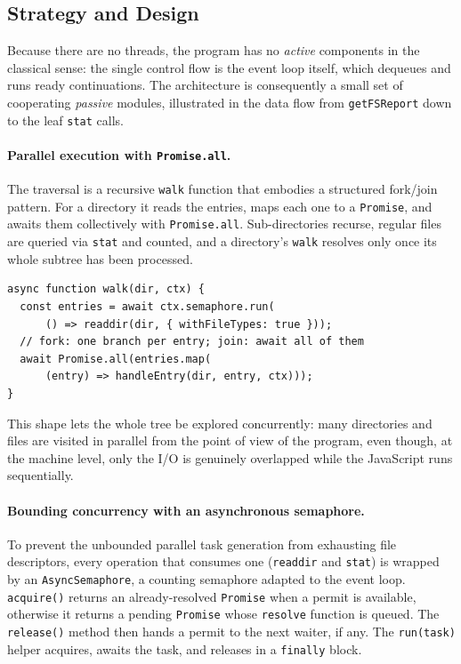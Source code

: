 \documentclass{scrartcl}
\begin{document}
\subsection{Strategy and Design}

Because there are no threads, the program has no \emph{active} components in the classical sense: the single control flow is the event loop itself, which dequeues and runs ready continuations. The architecture is consequently a small set of cooperating \emph{passive} modules, illustrated in the data flow from \texttt{getFSReport} down to the leaf \texttt{stat} calls.

\paragraph{Parallel execution with \texttt{Promise.all}.}
The traversal is a recursive \texttt{walk} function that embodies a structured fork/join pattern. For a directory it reads the entries, maps each one to a \texttt{Promise}, and awaits them collectively with \texttt{Promise.all}. Sub-directories recurse, regular files are queried via \texttt{stat} and counted, and a directory's \texttt{walk} resolves only once its whole subtree has been processed.

\begin{lstlisting}[style=js]
async function walk(dir, ctx) {
  const entries = await ctx.semaphore.run(
      () => readdir(dir, { withFileTypes: true }));
  // fork: one branch per entry; join: await all of them
  await Promise.all(entries.map(
      (entry) => handleEntry(dir, entry, ctx)));
}
\end{lstlisting}

This shape lets the whole tree be explored concurrently: many directories and files are visited in parallel from the point of view of the program, even though, at the machine level, only the I/O is genuinely overlapped while the JavaScript runs sequentially.

\paragraph{Bounding concurrency with an asynchronous semaphore.}
To prevent the unbounded parallel task generation from exhausting file descriptors, every operation that consumes one (\texttt{readdir} and \texttt{stat}) is wrapped by an \texttt{AsyncSemaphore}, a counting semaphore adapted to the event loop. \texttt{acquire()} returns an already-resolved \texttt{Promise} when a permit is available, otherwise it returns a pending \texttt{Promise} whose \texttt{resolve} function is queued. The \texttt{release()} method then hands a permit to the next waiter, if any. The \texttt{run(task)} helper acquires, awaits the task, and releases in a \texttt{finally} block.
\end{document}
